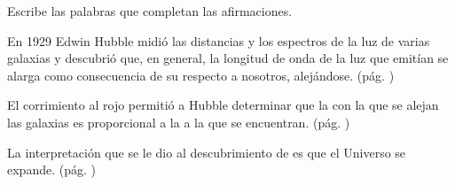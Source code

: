 Escribe las palabras que completan las afirmaciones.
\begin{parts}
    En 1929 Edwin Hubble midió las distancias y los espectros de la luz de varias galaxias
    y descubrió que, en general, la longitud de onda de la luz que emitían se alarga como
    consecuencia de su \fillin[movimiento][2cm] respecto a nosotros, alejándose. (pág. \pageref{086b_a})

    El corrimiento al rojo permitió a Hubble determinar que la \fillin[velocidad][2cm]
    con la que se alejan las galaxias es proporcional a la \fillin[distancia][2cm] a la que se encuentran. (pág. \pageref{086b_b})

    La interpretación que se le dio al descubrimiento de \fillin[Hubble][2cm] es que el Universo se expande. (pág. \pageref{086b_c})
\end{parts}